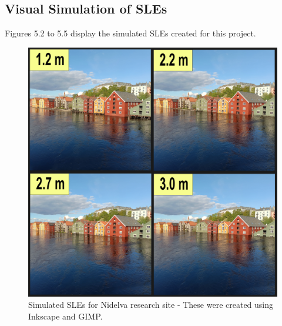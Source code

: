 \subsection{Visual Simulation of SLEs}
 Figures 5.2 to 5.5 display the simulated SLEs created for this project. 

\begin{figure}[H]
    \centering
    \includegraphics[width=16cm]{fig_sle/nidelva 2090 q.png}
    \caption{Simulated SLEs for Nidelva research site - These were created using Inkscape and GIMP. }
    \label{fig:SLE-nidelva}
\end{figure}

